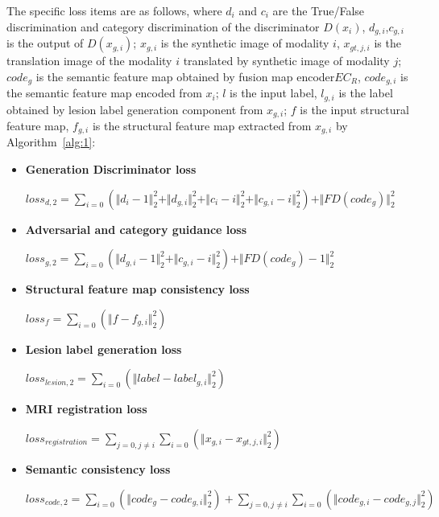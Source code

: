 \documentclass[letterpaper]{article} %
\begin{document}
The specific loss items are as follows, where $d_{i}$ and $c_{i}$ are the True/False discrimination and category discrimination of the discriminator $D(x_i)$, $d_{g, i}$,$c_{g,i}$ is the output of $D(x_{g,i})$; $x_{g,i}$ is the synthetic image of modality $i$, $x_{gt,j,i}$ is the translation image of the modality $i$ translated by synthetic image of modality $j$; $code_g$ is the semantic feature map obtained by fusion map encoder$EC_R$, $code_{g,i}$ is the semantic feature map encoded from $x_i$; $l$ is the input label, $l_{g,i}$ is the label obtained by lesion label generation component from $x_{g,i}$; $f$ is the input structural feature map, $f_{g,i}$ is the structural feature map extracted from $x_{g,i}$ by Algorithm~\ref{alg:1}:
\begin{itemize}
	\item \textbf{Generation Discriminator loss }
	\begin{center}
		$loss_{d,2}=\sum\limits_{i=0}(\Vert{d_{i}-1}\Vert_{2}^{2}+\Vert{d_{g,i}}\Vert_{2}^{2}+\Vert{c_{i}-i}\Vert_{2}^{2}+\Vert{c_{g,i}-i}\Vert_{2}^{2})+\Vert{FD(code_{g})}\Vert_{2}^{2}$
	\end{center}

	\item \textbf{Adversarial and category guidance loss}
	\begin{center}
		$loss_{g,2}=\sum\limits_{i=0}(\Vert{d_{g,i}-1}\Vert_{2}^{2}+\Vert{c_{g,i}-i}\Vert_{2}^{2})+\Vert{FD(code_{g})-1}\Vert_{2}^{2}$
	\end{center}
	
	\item \textbf{Structural feature map consistency loss}
	\begin{center}
		$loss_{f}=\sum\limits_{i=0}(\Vert{f-f_{g,i}}\Vert_{2}^{2})$
	\end{center}
	
	\item \textbf{Lesion label generation loss}
	\begin{center}
		$loss_{lesion,2}=\sum\limits_{i=0}(\Vert{label-label_{g,i}}\Vert_{2}^{2})$
	\end{center}
	
	\item \textbf{MRI registration loss}
	\begin{center}
		$loss_{registration}=\sum\limits_{j=0,j\neq i}\sum\limits_{i=0}(\Vert{x_{g,i}-x_{gt,j,i}}\Vert_{2}^{2})$
	\end{center}
	
	\item \textbf{Semantic consistency loss}
	\begin{center}
		$loss_{code,2}=\sum\limits_{i=0}(\Vert{code_g-code_{g,i}}\Vert_{2}^{2})+\sum\limits_{j=0,j\neq i}\sum\limits_{i=0}(\Vert{code_{g,i}-code_{g,j}}\Vert_{2}^{2})$
	\end{center}
	
\end{itemize}
\end{document}
